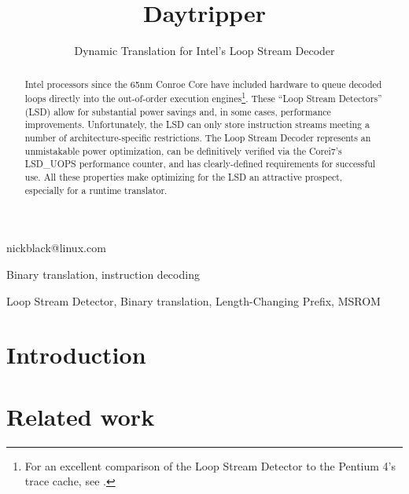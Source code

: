 \documentclass[]{sigplanconf}
\begin{document}

\title{Daytripper}
\subtitle{Dynamic Translation for Intel's Loop Stream Decoder}

           {nickblack@linux.com}

\maketitle

\begin{abstract}
Intel processors since the 65nm Conroe Core
have included hardware to queue decoded loops directly into the out-of-order
execution engines\footnote{For an excellent comparison of the Loop Stream
Detector to the Pentium 4's trace cache, see \cite{kanter}.}. These ``Loop
Stream Detectors'' (LSD) allow for substantial power savings and, in some
cases, performance improvements. Unfortunately, the LSD can only store
instruction streams meeting a number of architecture-specific restrictions.
The Loop Stream Decoder represents an unmistakable power optimization, can be
definitively verified via the Core\texttrademark i7's LSD\_UOPS performance
counter, and has clearly-defined requirements for successful use. All these
properties make optimizing for the LSD an attractive prospect, especially for
a runtime translator.  
\end{abstract}


\terms
Binary translation, instruction decoding

\keywords
Loop Stream Detector, Binary translation, Length-Changing Prefix, MSROM

\section{Introduction}
\cite{inteloptimize}

\section{Related work}
\end{document}
